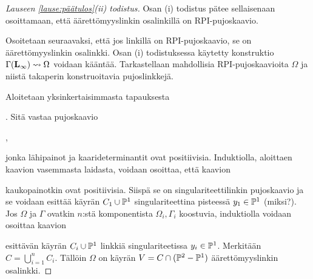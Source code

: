 \begin{proof}[Lauseen \ref{lause:päätulos}(ii) todistus]
    Osan (i) todistus pätee sellaisenaan osoittamaan, että äärettömyyslinkin osalinkillä on RPI-pujoskaavio.

    Osoitetaan seuraavaksi, että jos linkillä on RPI-pujoskaavio, se on äärettömyyslinkin osalinkki. Osan (i) todistuksessa käytetty konstruktio $\Gamma(\linkki_\infty)\leadsto\Omega$ voidaan kääntää. Tarkastellaan mahdollisia RPI-pujoskaavioita $\Omega$ ja niistä takaperin konstruoitavia pujoslinkkejä.

    Aloitetaan yksinkertaisimmasta tapauksesta
    .
    Sitä vastaa pujoskaavio
    \begin{center}
        ,
    \end{center}
    jonka lähipainot ja kaarideterminantit ovat positiivisia. Induktiolla, aloittaen kaavion vasemmasta laidasta, voidaan osoittaa, että kaavion 
    kaukopainotkin ovat positiivisia. Siispä se on singulariteettilinkin pujoskaavio ja se voidaan esittää käyrän $C_1\cup\P^1$ singulariteettina pisteessä $y_1\in\P^1$ (miksi?). Jos $\Omega$ ja $\Gamma$ ovatkin $n$:stä komponentista $\Omega_i,\Gamma_i$ koostuvia, induktiolla voidaan osoittaa kaavion
    esittävän käyrän $C_i\cup\P^1$ linkkiä singulariteetissa $y_i\in\P^1$. Merkitään $C=\bigcup_{i=1}^n C_i$. Tällöin $\Omega$ on käyrän $V=C\cap(\P^2-\P^1)$ äärettömyyslinkin osalinkki.
\end{proof}